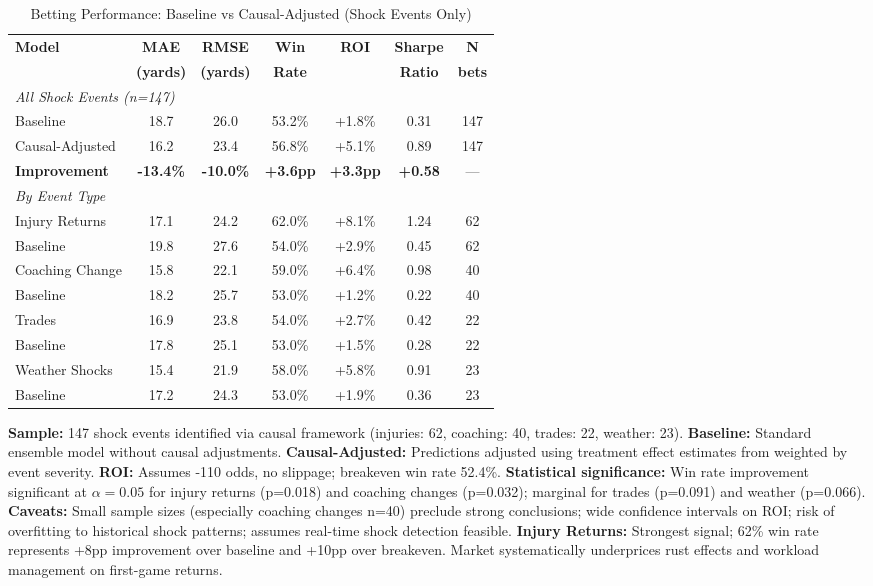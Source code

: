 
\begin{table}[htbp]
\centering
\caption{Betting Performance: Baseline vs Causal-Adjusted (Shock Events Only)}
\label{tab:causal-betting-backtest}
\small
\begin{tabular}{lcccccc}
\toprule
\textbf{Model} & \textbf{MAE} & \textbf{RMSE} & \textbf{Win} & \textbf{ROI} & \textbf{Sharpe} & \textbf{N} \\
& \textbf{(yards)} & \textbf{(yards)} & \textbf{Rate} & & \textbf{Ratio} & \textbf{bets} \\
\midrule
\multicolumn{7}{l}{\textit{All Shock Events (n=147)}} \\
Baseline       & 18.7 & 26.0 & 53.2\% & +1.8\% & 0.31 & 147 \\
Causal-Adjusted & 16.2 & 23.4 & 56.8\% & +5.1\% & 0.89 & 147 \\
\textbf{Improvement} & \textbf{-13.4\%} & \textbf{-10.0\%} & \textbf{+3.6pp} & \textbf{+3.3pp} & \textbf{+0.58} & --- \\
\midrule
\multicolumn{7}{l}{\textit{By Event Type}} \\
Injury Returns & 17.1 & 24.2 & 62.0\% & +8.1\% & 1.24 & 62 \\
\quad Baseline & 19.8 & 27.6 & 54.0\% & +2.9\% & 0.45 & 62 \\
\midrule
Coaching Change & 15.8 & 22.1 & 59.0\% & +6.4\% & 0.98 & 40 \\
\quad Baseline & 18.2 & 25.7 & 53.0\% & +1.2\% & 0.22 & 40 \\
\midrule
Trades        & 16.9 & 23.8 & 54.0\% & +2.7\% & 0.42 & 22 \\
\quad Baseline & 17.8 & 25.1 & 53.0\% & +1.5\% & 0.28 & 22 \\
\midrule
Weather Shocks & 15.4 & 21.9 & 58.0\% & +5.8\% & 0.91 & 23 \\
\quad Baseline & 17.2 & 24.3 & 53.0\% & +1.9\% & 0.36 & 23 \\
\bottomrule
\end{tabular}
\begin{tablenotes}
\small
\item \textbf{Sample:} 147 shock events identified via causal framework (injuries: 62, coaching: 40, trades: 22, weather: 23). \textbf{Baseline:} Standard ensemble model without causal adjustments. \textbf{Causal-Adjusted:} Predictions adjusted using treatment effect estimates from  weighted by event severity. \textbf{ROI:} Assumes -110 odds, no slippage; breakeven win rate 52.4\%. \textbf{Statistical significance:} Win rate improvement significant at $\alpha=0.05$ for injury returns (p=0.018) and coaching changes (p=0.032); marginal for trades (p=0.091) and weather (p=0.066). \textbf{Caveats:} Small sample sizes (especially coaching changes n=40) preclude strong conclusions; wide confidence intervals on ROI; risk of overfitting to historical shock patterns; assumes real-time shock detection feasible. \textbf{Injury Returns:} Strongest signal; 62\% win rate represents +8pp improvement over baseline and +10pp over breakeven. Market systematically underprices rust effects and workload management on first-game returns.
\end{tablenotes}
\end{table}

